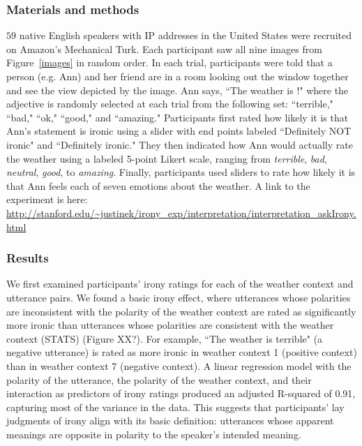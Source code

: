 \documentclass[10pt,letterpaper]{article}
\begin{document}
\subsubsection{Materials and methods}
$59$ native English speakers with IP addresses in the United States were recruited on Amazon's Mechanical Turk. Each participant saw all nine images from Figure~\ref{images} in random order. In each trial, participants were told that a person (e.g. Ann) and her friend are in a room looking out the window together and see the view depicted by the image. Ann says, ``The weather is \underline{\hspace{1cm}}!" where the adjective is randomly selected at each trial from the following set: ``terrible," ``bad," ``ok," ``good," and ``amazing." Participants first rated how likely it is that Ann's statement is ironic using a slider with end points labeled ``Definitely NOT ironic" and ``Definitely ironic." They then indicated how Ann would actually rate the weather using a labeled 5-point Likert scale, ranging from \emph{terrible}, \emph{bad}, \emph{neutral}, \emph{good}, to \emph{amazing}. Finally, participants used sliders to rate how likely it is that Ann feels each of seven emotions about the weather. A link to the experiment is here: \url{http://stanford.edu/~justinek/irony_exp/interpretation/interpretation_askIrony.html}

\subsubsection{Results}
We first examined participants' irony ratings for each of the weather context and utterance pairs. We found a basic irony effect, where utterances whose polarities are inconsistent with the polarity of the weather context are rated as significantly more ironic than utterances whose polarities are consistent with the weather context (STATS) (Figure XX?). For example, ``The weather is terrible" (a negative utterance) is rated as more ironic in weather context 1 (positive context) than in weather context 7 (negative context). A linear regression model with the polarity of the utterance, the polarity of the weather context, and their interaction as predictors of irony ratings produced an adjusted R-squared of 0.91, capturing most of the variance in the data. This suggests that participants' lay judgments of irony align with its basic definition: utterances whose apparent meanings are opposite in polarity to the speaker's intended meaning.

\end{document}
